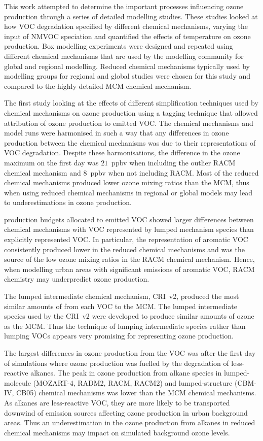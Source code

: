 This work attempted to determine the important processes influencing ozone production through a series of detailed modelling studies.
These studies looked at how VOC degradation specified by different chemical mechanisms, varying the input of NMVOC speciation and quantified the effects of temperature on ozone production.
Box modelling experiments were designed and repeated using different chemical mechanisms that are used by the modelling community for global and regional modelling.
Reduced chemical mechanisms typically used by modelling groups for regional and global studies were chosen for this study and compared to the highly detailed MCM chemical mechanism.

The first study looking at the effects of different simplification techniques used by chemical mechanisms on ozone production using a tagging technique that allowed attribution of ozone production to emitted VOC.
The chemical mechanisms and model runs were harmonised in such a way that any differences in ozone production between the chemical mechanisms was due to their representations of VOC degradation.
Despite these harmonisations, the difference in the ozone maximum on the first day was $21$~ppbv when including the outlier RACM chemical mechanism and $8$~ppbv when not including RACM.
Most of the reduced chemical mechanisms produced lower ozone mixing ratios than the MCM, thus when using reduced chemical mechanisms in regional or global models may lead to underestimations in ozone production.

 production budgets allocated to emitted VOC showed larger differences between chemical mechanisms with VOC represented by lumped mechanism species than explicitly represented VOC.
In particular, the representation of aromatic VOC consistently produced lower  in the reduced chemical mechanisms and was the source of the low ozone mixing ratios in the RACM chemical mechanism.
Hence, when modelling urban areas with significant emissions of aromatic VOC, RACM chemistry may underpredict ozone production.

The lumped intermediate chemical mechanism, CRI~v2, produced the most similar amounts of  from each VOC to the MCM.
The lumped intermediate species used by the CRI~v2 were developed to produce similar amounts of ozone as the MCM.
Thus the technique of lumping intermediate species rather than lumping VOCs appears very promising for representing ozone production.

The largest differences in ozone production from the VOC was after the first day of simulations where ozone production was fuelled by the degradation of less-reactive alkanes.
The peak in ozone production from alkane species in lumped-molecule (MOZART-4, RADM2, RACM, RACM2) and lumped-structure (CBM-IV, CB05) chemical mechanisms was lower than the MCM chemical mechanisms.
As alkanes are less-reactive VOC, they are more likely to be transported downwind of emission sources affecting ozone production in urban background areas.
Thus an underestimation in the ozone production from alkanes in reduced chemical mechanisms may impact on simulated background ozone levels.

